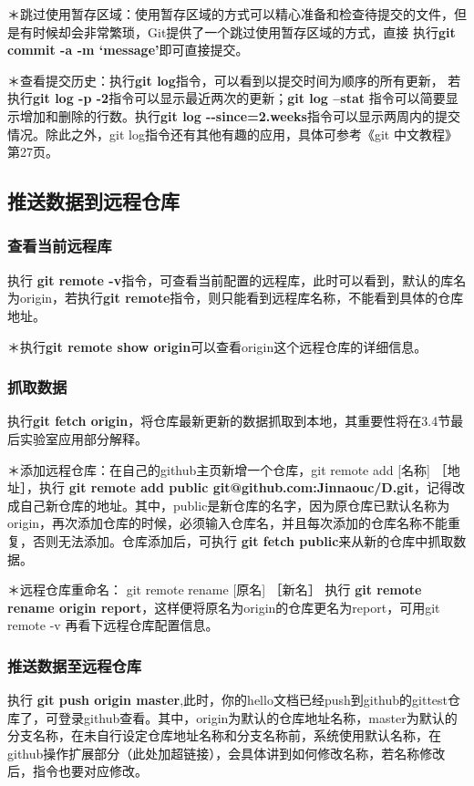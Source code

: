 \documentclass{article}
\begin{document}
＊跳过使用暂存区域：使用暂存区域的方式可以精心准备和检查待提交的文件，但是有时候却会非常繁琐，Git提供了一个跳过使用暂存区域的方式，直接 执行\textbf{git commit -a -m `message'}即可直接提交。 

＊查看提交历史：执行\textbf{git log}指令，可以看到以提交时间为顺序的所有更新， 若执行\textbf{git log -p -2}指令可以显示最近两次的更新；\textbf{git log --stat} 指令可以简要显示增加和删除的行数。执行\textbf{git log {-}{-}since=2.weeks}指令可以显示两周内的提交情况。除此之外，git log指令还有其他有趣的应用，具体可参考《git 中文教程》 第27页。

\subsection{推送数据到远程仓库}
\subsubsection{查看当前远程库}
执行 \textbf{git remote -v}指令，可查看当前配置的远程库，此时可以看到，默认的库名为origin，若执行\textbf{git remote}指令，则只能看到远程库名称，不能看到具体的仓库地址。

＊执行\textbf{git remote show origin}可以查看origin这个远程仓库的详细信息。

\subsubsection{抓取数据}
执行\textbf{git fetch origin}，将仓库最新更新的数据抓取到本地，其重要性将在3.4节最后实验室应用部分解释。

＊添加远程仓库：在自己的github主页新增一个仓库，git remote add [名称] ［地址］，执行 \textbf{git remote add public git@github.com:Jinnaouc/D.git}，记得改成自己新仓库的地址。其中，public是新仓库的名字，因为原仓库已默认名称为origin，再次添加仓库的时候，必须输入仓库名，并且每次添加的仓库名称不能重复，否则无法添加。仓库添加后，可执行 \textbf{git fetch public}来从新的仓库中抓取数据。

＊远程仓库重命名： git remote rename [原名] ［新名］ 执行 \textbf{git remote rename origin report}，这样便将原名为origin的仓库更名为report，可用git remote -v 再看下远程仓库配置信息。
\subsubsection{推送数据至远程仓库}
执行 \textbf{git push origin master},此时，你的hello文档已经push到github的gittest仓库了，可登录github查看。其中，origin为默认的仓库地址名称，master为默认的分支名称，在未自行设定仓库地址名称和分支名称前，系统使用默认名称，在github操作扩展部分（此处加超链接），会具体讲到如何修改名称，若名称修改后，指令也要对应修改。
\end{document}
